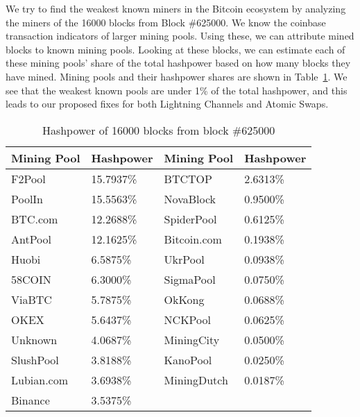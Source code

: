We try to find the weakest known miners in the Bitcoin ecosystem by analyzing the miners of the 16000 blocks from Block \#625000. We know the coinbase transaction indicators of larger mining pools. Using these, we can attribute mined blocks to known mining pools. Looking at these blocks, we can estimate each of these mining pools' share of the total hashpower based on how many blocks they have mined. Mining pools and their hashpower shares are shown in Table~\ref{table:mining_powers}. We see that the weakest known pools are under 1\% of the total hashpower, and this leads to our proposed fixes for both Lightning Channels and Atomic Swaps. 

\begin{table}[ht]
\caption{Hashpower of 16000 blocks from block \#625000} 
\centering
\begin{tabular}{|l|l|l|l|}
\hline
        Mining Pool & Hashpower & Mining Pool & Hashpower \\
\hline
 F2Pool     & 15.7937\% & BTCTOP      & 2.6313\% \\
 PoolIn     & 15.5563\% & NovaBlock   & 0.9500\% \\
 BTC.com    & 12.2688\% & SpiderPool  & 0.6125\% \\
 AntPool    & 12.1625\% & Bitcoin.com & 0.1938\% \\
 Huobi      & 6.5875\%  & UkrPool     & 0.0938\% \\
 58COIN     & 6.3000\%  & SigmaPool   & 0.0750\% \\
 ViaBTC     & 5.7875\%  & OkKong      & 0.0688\% \\
 OKEX       & 5.6437\%  & NCKPool     & 0.0625\% \\
 Unknown    & 4.0687\%  & MiningCity  & 0.0500\% \\
 SlushPool  & 3.8188\%  & KanoPool    & 0.0250\% \\
 Lubian.com & 3.6938\%  & MiningDutch & 0.0187\% \\
 Binance    & 3.5375\%  &             &         \\
\hline
\end{tabular}
\label{table:mining_powers}
\end{table}


